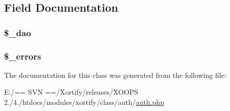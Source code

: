 \subsection{Field Documentation}
\hypertarget{class_xortify_auth_a12a029c610f699b4b25e79a1f64a3485}{
\subsubsection[{\$\-\_\-dao}]{\setlength{\rightskip}{0pt plus 5cm}\$\-\_\-dao}}\label{class_xortify_auth_a12a029c610f699b4b25e79a1f64a3485}
\hypertarget{class_xortify_auth_a09272cb16edd572f760a622f37cee6d1}{
\subsubsection[{\$\-\_\-errors}]{\setlength{\rightskip}{0pt plus 5cm}\$\-\_\-errors}}\label{class_xortify_auth_a09272cb16edd572f760a622f37cee6d1}


The documentation for this class was generated from the following file\-:\begin{DoxyCompactItemize}
\item 
E\-:/== S\-V\-N ==/\-Xortify/releases/\-X\-O\-O\-P\-S 2./4./htdocs/modules/xortify/class/auth/\hyperlink{auth_8php}{auth.\-php}\end{DoxyCompactItemize}
